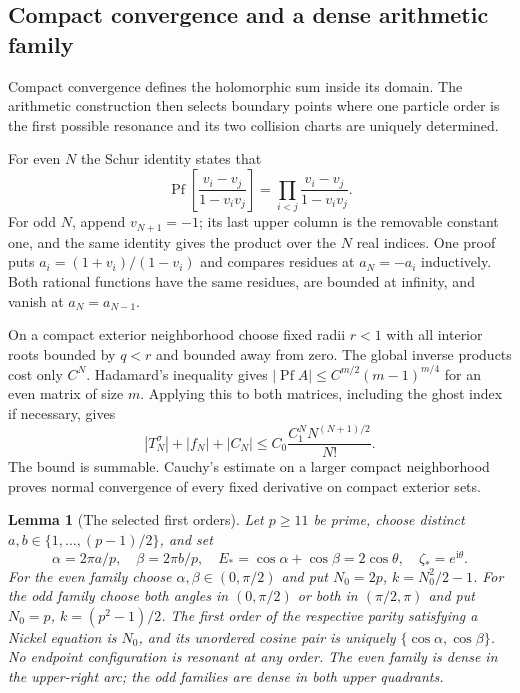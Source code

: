 \documentclass[11pt]{article}
\numberwithin{equation}{section}
\newtheorem{lemma}[theorem]{Lemma}
\theoremstyle{definition}
\newcommand{\ii}{\mathrm i}
\DeclareMathOperator{\Pf}{Pf}
\begin{document}
\subsection{Compact convergence and a dense arithmetic family}

Compact convergence defines the holomorphic sum inside its domain.
The arithmetic construction then selects boundary points where one
particle order is the first possible resonance and its two collision
charts are uniquely determined.

For even $N$ the Schur identity states that
\[
 \Pf\left[\frac{v_i-v_j}{1-v_iv_j}\right]
 =\prod_{i<j}\frac{v_i-v_j}{1-v_iv_j}.
\]
For odd $N$, append $v_{N+1}=-1$; its last upper column is the removable
constant one, and the same identity gives the product over the $N$ real
indices. One proof puts $a_i=(1+v_i)/(1-v_i)$ and compares residues at
$a_N=-a_i$ inductively. Both rational functions have the same residues,
are bounded at infinity, and vanish at $a_N=a_{N-1}$.

On a compact exterior neighborhood choose fixed radii $r<1$ with all
interior roots bounded by $q<r$ and bounded away from zero. The global
inverse products cost only $C^N$. Hadamard's inequality gives
$|\Pf A|\le C^{m/2}(m-1)^{m/4}$ for an even matrix of size $m$.
Applying this to both matrices, including the ghost index if necessary,
gives
\begin{equation}
 |T_N^\sigma|+|f_N|+|C_N|
 \le C_0\frac{C_1^N N^{(N+1)/2}}{N!}.
 \label{iso:normal}
\end{equation}
The bound is summable. Cauchy's estimate on a larger compact neighborhood
proves normal convergence of every fixed derivative on compact
exterior sets.

\begin{lemma}[The selected first orders]\label{iso:arithmetic}
Let $p\ge11$ be prime, choose distinct
$a,b\in\{1,\ldots,(p-1)/2\}$, and set
\[
 \alpha=2\pi a/p,\quad\beta=2\pi b/p,\quad
 E_*=\cos\alpha+\cos\beta=2\cos\theta,
 \quad\zeta_*=e^{\ii\theta}.
\]
For the even family choose $\alpha,\beta\in(0,\pi/2)$ and put
$N_0=2p$, $k=N_0^2/2-1$. For the odd family choose both angles in
$(0,\pi/2)$ or both in $(\pi/2,\pi)$ and put
$N_0=p$, $k=(p^2-1)/2$.
The first order of the respective parity satisfying a Nickel equation is
$N_0$, and its unordered cosine pair is uniquely
$\{\cos\alpha,\cos\beta\}$. No endpoint configuration is resonant at any
order. The even family is dense in the upper-right arc; the odd families
are dense in both upper quadrants.
\end{lemma}
\end{document}
